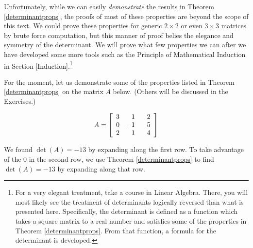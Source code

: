 \documentclass{ximera}
\begin{document}

\smallskip

Unfortunately, while we can easily \textit{demonstrate} the results in Theorem \ref{determinantprops}, the proofs of most of these properties are beyond the scope of this text.  We could prove these properties for generic $2 \times 2$ or even $3 \times 3$ matrices by brute force computation, but this manner of proof belies the elegance and symmetry of the determinant.  We will prove what few properties we can after we have developed some more tools such as the Principle of Mathematical Induction in Section \ref{Induction}.\footnote{For a very elegant treatment, take a course in Linear Algebra.  There, you will most likely see the treatment of determinants logically reversed than what is presented here.  Specifically, the determinant is defined as a function which takes a square matrix to a real number and satisfies some of the properties in Theorem \ref{determinantprops}. From that function, a formula for the determinant is developed.}  

For the moment, let us demonstrate some of the properties listed in Theorem \ref{determinantprops} on the matrix $A$ below.  (Others will be discussed in the Exercises.)

\[A =  \left[ \begin{array}{rrr} 3 & 1 & \hphantom{-}2 \\ 0 & -1 & 5 \\ 2 & 1 & 4 \\ \end{array} \right] \]

We found $\det(A) = -13$ by expanding along the first row.  To take advantage of the $0$ in the second row, we use Theorem \ref{determinantprops} to find $\det(A) = -13$ by expanding along that row.
\end{document}
